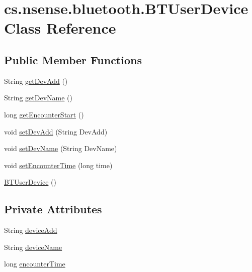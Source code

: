 \hypertarget{classcs_1_1nsense_1_1bluetooth_1_1_b_t_user_device}{\section{cs.\-nsense.\-bluetooth.\-B\-T\-User\-Device Class Reference}
\label{classcs_1_1nsense_1_1bluetooth_1_1_b_t_user_device}
}
\subsection*{Public Member Functions}
\begin{DoxyCompactItemize}
\item 
String \hyperlink{classcs_1_1nsense_1_1bluetooth_1_1_b_t_user_device_abf08a67c2fc540bb7e3f2802c5d52e20}{get\-Dev\-Add} ()
\item 
String \hyperlink{classcs_1_1nsense_1_1bluetooth_1_1_b_t_user_device_afd15dfa1c7a21b58469bbffb11fa0b75}{get\-Dev\-Name} ()
\item 
long \hyperlink{classcs_1_1nsense_1_1bluetooth_1_1_b_t_user_device_ac23e24db5f4a0f7c1c37bd2983358625}{get\-Encounter\-Start} ()
\item 
void \hyperlink{classcs_1_1nsense_1_1bluetooth_1_1_b_t_user_device_aad12d516148fe3364689c5e55939e456}{set\-Dev\-Add} (String Dev\-Add)
\item 
void \hyperlink{classcs_1_1nsense_1_1bluetooth_1_1_b_t_user_device_a78eddc40f1b3c638fa1f67363a841a9e}{set\-Dev\-Name} (String Dev\-Name)
\item 
void \hyperlink{classcs_1_1nsense_1_1bluetooth_1_1_b_t_user_device_ac5f2c8b515d83541876d5715b77f90a6}{set\-Encounter\-Time} (long time)
\item 
\hyperlink{classcs_1_1nsense_1_1bluetooth_1_1_b_t_user_device_ab949609dbdddc95adcd0aef85387672e}{B\-T\-User\-Device} ()
\end{DoxyCompactItemize}
\subsection*{Private Attributes}
\begin{DoxyCompactItemize}
\item 
String \hyperlink{classcs_1_1nsense_1_1bluetooth_1_1_b_t_user_device_ab2f5d68a784b0172e0b72108ebf8d5f5}{device\-Add}
\item 
String \hyperlink{classcs_1_1nsense_1_1bluetooth_1_1_b_t_user_device_af5d1136a1dd5fb98e2e4732cd2ee2d98}{device\-Name}
\item 
long \hyperlink{classcs_1_1nsense_1_1bluetooth_1_1_b_t_user_device_a2fddaddbc2f53f2326d72dbe15433892}{encounter\-Time}
\end{DoxyCompactItemize}


